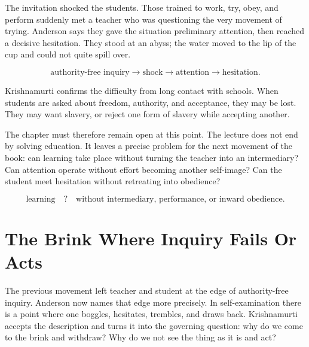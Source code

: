 \documentclass[11pt,oneside]{book}
\begin{document}
The invitation shocked the students. Those trained to work, try, obey, and perform suddenly met a teacher who was questioning the very movement of trying. Anderson says they gave the situation preliminary attention, then reached a decisive hesitation. They stood at an abyss; the water moved to the lip of the cup and could not quite spill over.

\begin{equation}
\text{authority-free inquiry}
\longrightarrow
\text{shock}
\longrightarrow
\text{attention}
\longrightarrow
\text{hesitation}.
\end{equation}

Krishnamurti confirms the difficulty from long contact with schools. When students are asked about freedom, authority, and acceptance, they may be lost. They may want slavery, or reject one form of slavery while accepting another.

The chapter must therefore remain open at this point. The lecture does not end by solving education. It leaves a precise problem for the next movement of the book: can learning take place without turning the teacher into an intermediary? Can attention operate without effort becoming another self-image? Can the student meet hesitation without retreating into obedience?

\begin{equation}
\text{learning}
\quad ? \quad
\text{without intermediary, performance, or inward obedience}.
\end{equation}


\section{The Brink Where Inquiry Fails Or Acts}

The previous movement left teacher and student at the edge of authority-free inquiry. Anderson now names that edge more precisely. In self-examination there is a point where one boggles, hesitates, trembles, and draws back. Krishnamurti accepts the description and turns it into the governing question: why do we come to the brink and withdraw? Why do we not see the thing as it is and act?
\end{document}
